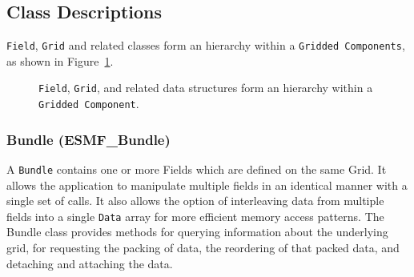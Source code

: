 \subsection{Class Descriptions}

{\tt Field}, {\tt Grid} and related classes form an hierarchy within 
a {\tt Gridded Components}, as shown in Figure~\ref{fig:datastruct}.

\begin{figure}
\caption[{Hierarchy of Data Structures}]{{\tt Field}, {\tt Grid}, and 
related data structures form an hierarchy within a {\tt Gridded Component}.}
\label{fig:datastruct}
\end{figure}


\subsubsection{Bundle (ESMF\_Bundle)}
\label{sec:bundle} 
A {\tt Bundle} contains one or more Fields which are defined on 
the same Grid.  It allows the application to manipulate multiple fields in 
an identical manner with a single set of calls.  It also allows the option 
of interleaving data from multiple fields into a single {\tt Data} array for 
more efficient memory access patterns.  The Bundle class provides methods 
for querying information about the underlying grid, for requesting the 
packing of data, the reordering of that packed data, and detaching and 
attaching the data.

